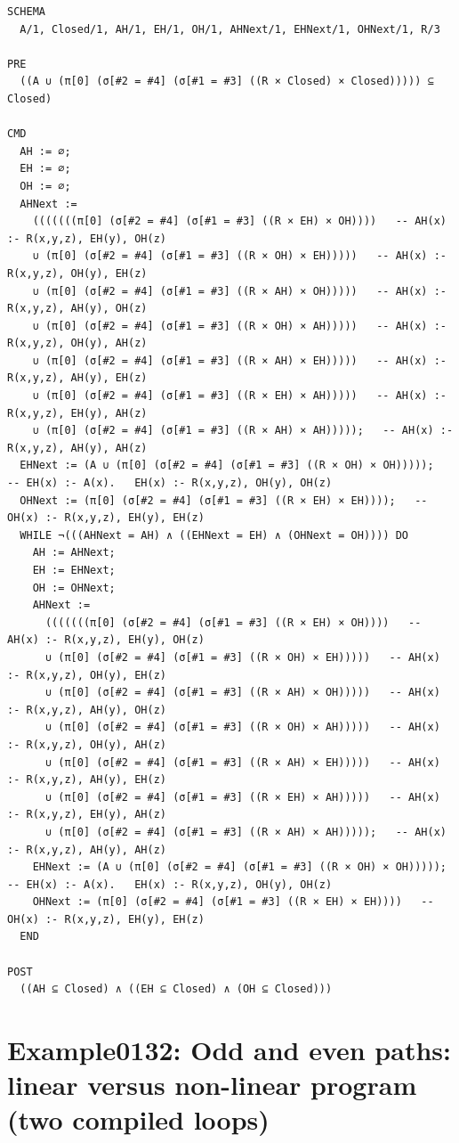 \documentclass[10pt]{article}
\begin{document}
\begin{Verbatim}[fontsize=\tiny,breaklines=true,breakanywhere=true,frame=single,framesep=1.5mm]
SCHEMA
  A/1, Closed/1, AH/1, EH/1, OH/1, AHNext/1, EHNext/1, OHNext/1, R/3

PRE
  ((A ∪ (π[0] (σ[#2 = #4] (σ[#1 = #3] ((R × Closed) × Closed))))) ⊆ Closed)

CMD
  AH := ∅;
  EH := ∅;
  OH := ∅;
  AHNext :=
    (((((((π[0] (σ[#2 = #4] (σ[#1 = #3] ((R × EH) × OH))))   -- AH(x) :- R(x,y,z), EH(y), OH(z)
    ∪ (π[0] (σ[#2 = #4] (σ[#1 = #3] ((R × OH) × EH)))))   -- AH(x) :- R(x,y,z), OH(y), EH(z)
    ∪ (π[0] (σ[#2 = #4] (σ[#1 = #3] ((R × AH) × OH)))))   -- AH(x) :- R(x,y,z), AH(y), OH(z)
    ∪ (π[0] (σ[#2 = #4] (σ[#1 = #3] ((R × OH) × AH)))))   -- AH(x) :- R(x,y,z), OH(y), AH(z)
    ∪ (π[0] (σ[#2 = #4] (σ[#1 = #3] ((R × AH) × EH)))))   -- AH(x) :- R(x,y,z), AH(y), EH(z)
    ∪ (π[0] (σ[#2 = #4] (σ[#1 = #3] ((R × EH) × AH)))))   -- AH(x) :- R(x,y,z), EH(y), AH(z)
    ∪ (π[0] (σ[#2 = #4] (σ[#1 = #3] ((R × AH) × AH)))));   -- AH(x) :- R(x,y,z), AH(y), AH(z)
  EHNext := (A ∪ (π[0] (σ[#2 = #4] (σ[#1 = #3] ((R × OH) × OH)))));   -- EH(x) :- A(x).   EH(x) :- R(x,y,z), OH(y), OH(z)
  OHNext := (π[0] (σ[#2 = #4] (σ[#1 = #3] ((R × EH) × EH))));   -- OH(x) :- R(x,y,z), EH(y), EH(z)
  WHILE ¬(((AHNext = AH) ∧ ((EHNext = EH) ∧ (OHNext = OH)))) DO
    AH := AHNext;
    EH := EHNext;
    OH := OHNext;
    AHNext :=
      (((((((π[0] (σ[#2 = #4] (σ[#1 = #3] ((R × EH) × OH))))   -- AH(x) :- R(x,y,z), EH(y), OH(z)
      ∪ (π[0] (σ[#2 = #4] (σ[#1 = #3] ((R × OH) × EH)))))   -- AH(x) :- R(x,y,z), OH(y), EH(z)
      ∪ (π[0] (σ[#2 = #4] (σ[#1 = #3] ((R × AH) × OH)))))   -- AH(x) :- R(x,y,z), AH(y), OH(z)
      ∪ (π[0] (σ[#2 = #4] (σ[#1 = #3] ((R × OH) × AH)))))   -- AH(x) :- R(x,y,z), OH(y), AH(z)
      ∪ (π[0] (σ[#2 = #4] (σ[#1 = #3] ((R × AH) × EH)))))   -- AH(x) :- R(x,y,z), AH(y), EH(z)
      ∪ (π[0] (σ[#2 = #4] (σ[#1 = #3] ((R × EH) × AH)))))   -- AH(x) :- R(x,y,z), EH(y), AH(z)
      ∪ (π[0] (σ[#2 = #4] (σ[#1 = #3] ((R × AH) × AH)))));   -- AH(x) :- R(x,y,z), AH(y), AH(z)
    EHNext := (A ∪ (π[0] (σ[#2 = #4] (σ[#1 = #3] ((R × OH) × OH)))));   -- EH(x) :- A(x).   EH(x) :- R(x,y,z), OH(y), OH(z)
    OHNext := (π[0] (σ[#2 = #4] (σ[#1 = #3] ((R × EH) × EH))))   -- OH(x) :- R(x,y,z), EH(y), EH(z)
  END

POST
  ((AH ⊆ Closed) ∧ ((EH ⊆ Closed) ∧ (OH ⊆ Closed)))
\end{Verbatim}

\Needspace{0.45\textheight}

\section{Example0132: Odd and even paths: linear versus non-linear program (two compiled loops)}\label{case:Example0132}
\end{document}
